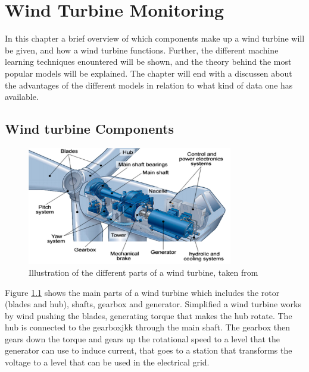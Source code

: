 \chapter{Wind Turbine Monitoring} \label{chap:wt_monitoring}

In this chapter a brief overview of which components make up a wind turbine will be given, and how a wind turbine functions. 
Further, the different machine learning techniques enountered will be shown, and the theory behind the most popular models will be explained. The chapter will end with a discussen about the advantages of the different models in relation to what kind of data one has available.

\section{Wind turbine Components}

\begin{figure}[h]
    \begin{center}
    \includegraphics[width=0.8\textwidth]{wind_turbine/wt_parts.png}
    \end{center}
    \caption{Illustration of the different parts of a wind turbine, taken from \textcite{adv_meth_for_wt_cond_monit_rev}}
    \label{fig:wt_parts}
\end{figure}

Figure \ref{fig:wt_parts} shows the main parts of a wind turbine which includes the rotor (blades and hub), shafts, gearbox and generator. 
Simplified a wind turbine works by wind pushing the blades, generating torque that makes the hub rotate. 
The hub is connected to the gearboxjkk through the main shaft. 
The gearbox then gears down the torque and gears up the rotational speed to a level that the generator can use to induce current, that goes to a station that transforms the voltage to a level that can be used in the electrical grid. 

